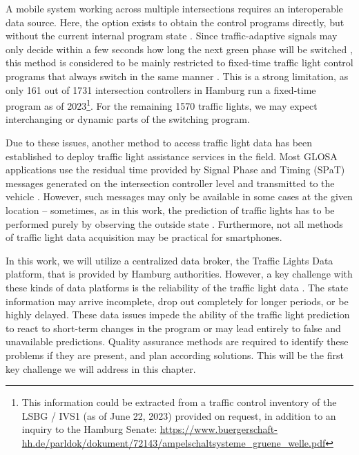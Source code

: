 A mobile system working across multiple intersections requires an interoperable data source. Here, the option exists to obtain the control programs directly, but without the current internal program state \cite{zweck_traffic_2013}. Since traffic-adaptive signals may only decide within a few seconds how long the next green phase will be switched \cite{islam_improved_2016}, this method is considered to be mainly restricted to fixed-time traffic light control programs that always switch in the same manner \cite{zweck_traffic_2013}. This is a strong limitation, as only 161 out of 1731 intersection controllers in Hamburg run a fixed-time program as of 2023\footnote{This information could be extracted from a traffic control inventory of the LSBG / IVS1 (as of June 22, 2023) provided on request, in addition to an inquiry to the Hamburg Senate: \url{https://www.buergerschaft-hh.de/parldok/dokument/72143/ampelschaltsysteme_gruene_welle.pdf}}. For the remaining 1570 traffic lights, we may expect interchanging or dynamic parts of the switching program.

Due to these issues, another method to access traffic light data has been established to deploy traffic light assistance services in the field. Most GLOSA applications use the residual time provided by Signal Phase and Timing (SPaT) messages generated on the intersection controller level and transmitted to the vehicle \cite{wagner_spatmap_2023}. However, such messages may only be available in some cases at the given location -- sometimes, as in this work, the prediction of traffic lights has to be performed purely by observing the outside state \cite{protschky_extensive_2014, protschky_adaptive_2014}. Furthermore, not all methods of traffic light data acquisition may be practical for smartphones.

In this work, we will utilize a centralized data broker, the Traffic Lights Data platform, that is provided by Hamburg authorities. However, a key challenge with these kinds of data platforms is the reliability of the traffic light data \cite{protschky_extensive_2014, protschky_adaptive_2014}. The state information may arrive incomplete, drop out completely for longer periods, or be highly delayed. These data issues impede the ability of the traffic light prediction to react to short-term changes in the program or may lead entirely to false and unavailable predictions. Quality assurance methods are required to identify these problems if they are present, and plan according solutions. This will be the first key challenge we will address in this chapter.


